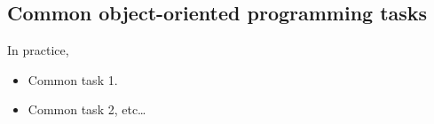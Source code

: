 \subsection{Common object-oriented programming tasks}

In practice, 
\begin{itemize}
  \item Common task 1.
  \item Common task 2, etc\ldots
\end{itemize}

